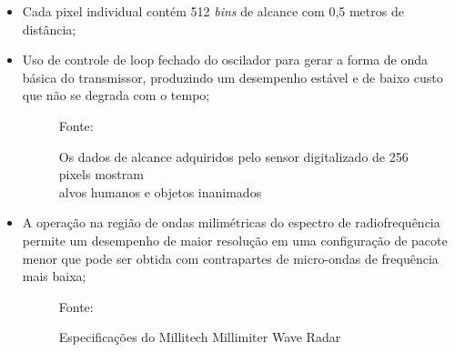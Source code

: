 \documentclass[xcolor=dvipsnames, aspectratio=169]{beamer}
\begin{document}
\begin{frame}
\begin{itemize}
        \item Cada pixel individual contém 512 \textit{bins} de alcance com 0,5 metros de distância;
        \item Uso de controle de loop fechado do oscilador para gerar a forma de onda básica do transmissor, produzindo um desempenho estável e de baixo custo que não se degrada com o tempo;
        \newpage
        \begin{figure}
            \centering
            {Fonte: \cite{everett1995sensors}}
            \caption{Os dados de alcance adquiridos pelo sensor digitalizado de 256 pixels mostram \\ alvos humanos e objetos inanimados}
            \label{fig:militech_sensor_data}
        \end{figure}


        \item A operação na região de ondas milimétricas do espectro de radiofrequência permite um desempenho de maior resolução em uma configuração de pacote menor que pode ser obtida com contrapartes de micro-ondas de frequência mais baixa;

        \begin{figure}
            \centering
            {Fonte: \cite{everett1995sensors}}
            \caption{Especificações do Millitech Millimiter Wave Radar}
            \label{fig:militech_specs}
        \end{figure}

	\end{itemize}
\end{frame}
\end{document}
